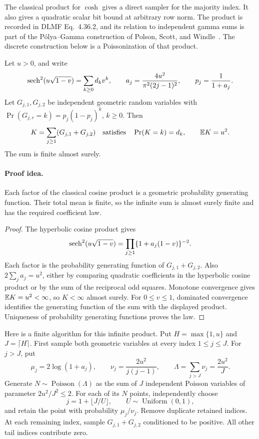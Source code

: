 The classical product for $\cosh$ gives a direct sampler for the
majority index. It also gives a quadratic scalar bit bound at
arbitrary row norm. The product is recorded in DLMF
Eq.~4.36.2, and its relation to independent gamma sums is part of
the P\'olya--Gamma construction of Polson, Scott, and
Windle~\cite{dlmf,polson2013}. The discrete construction below is
a Poissonization of that product.

\begin{lemma}
\label{lem:productaritylaw}
Let $u>0$, and write
\[
 \operatorname{sech}^2(u\sqrt{1-v})=\sum_{k\ge0}d_kv^k,
 \qquad
 a_j=\frac{4u^2}{\pi^2(2j-1)^2},
 \qquad p_j=\frac1{1+a_j}.
\]
Let $G_{j,1},G_{j,2}$ be independent geometric random variables
with $\Pr(G_{j,r}=k)=p_j(1-p_j)^k$, $k\ge0$.
Then
\[
 K=\sum_{j\ge1}(G_{j,1}+G_{j,2})
 \quad\hbox{satisfies}\quad
 \Pr(K=k)=d_k,\qquad \mathbb E K=u^2.
\]
The sum is finite almost surely.
\end{lemma}
\paragraph{Proof idea.}
Each factor of the classical cosine product is a geometric probability
generating function. Their total mean is finite, so the infinite sum is
almost surely finite and has the required coefficient law.

\begin{proof}
The hyperbolic cosine product gives
\[
 \operatorname{sech}^2(u\sqrt{1-v})
 =\prod_{j\ge1}\{1+a_j(1-v)\}^{-2}.
\]
Each factor is the probability generating function of
$G_{j,1}+G_{j,2}$. Also
$2\sum_j a_j=u^2$, either by comparing quadratic coefficients
in the hyperbolic cosine product or by the sum of the reciprocal
odd squares. Monotone convergence gives $\mathbb E K=u^2<\infty$,
so $K<\infty$ almost surely. For $0\le v\le1$, dominated
convergence identifies the generating function of the sum with
the displayed product. Uniqueness of probability generating
functions proves the law.
\end{proof}

Here is a finite algorithm for this infinite product. Put
$H=\max\{1,u\}$ and $J=\lceil H\rceil$. First sample both
geometric variables at every index $1\le j\le J$. For $j>J$,
put
\[
 \mu_j=2\log(1+a_j),\qquad
 \nu_j=\frac{2u^2}{j(j-1)},\qquad
 \Lambda=\sum_{j>J}\nu_j=\frac{2u^2}{J}.
\]
Generate $N\sim\operatorname{Poisson}(\Lambda)$ as the sum of
$J$ independent Poisson variables of parameter $2u^2/J^2\le2$.
For each of its $N$ points, independently choose
\begin{equation}\label{eq:producttailindex}
 j=1+\lfloor J/U\rfloor,
 \qquad U\sim\operatorname{Uniform}(0,1),
\end{equation}
and retain the point with probability $\mu_j/\nu_j$.
Remove duplicate retained indices. At each remaining index,
sample $G_{j,1}+G_{j,2}$ conditioned to be positive.
All other tail indices contribute zero.

